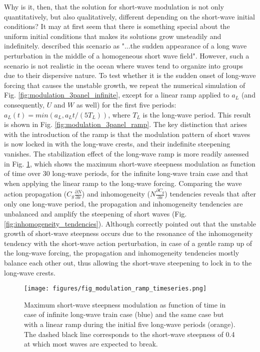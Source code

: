 \documentclass[lineno]{jfm}
\begin{document}
Why is it, then, that the solution for short-wave modulation is not only
quantitatively, but also qualitatively, different depending on the short-wave
initial conditions?
It may at first seem that there is something special about the uniform initial
conditions that makes its solutions grow unsteadily and indefinitely.
\citet{peureux2021unsteady} described this scenario as "...the sudden appearance
of a long wave perturbation in the middle of a homogeneous short wave field".
However, such a scenario is not realistic in the ocean where waves tend to
organize into groups due to their dispersive nature.
To test whether it is the sudden onset of long-wave forcing that causes the
unstable growth, we repeat the numerical simulation of Fig.
\ref{fig:modulation_3panel_infinite}, except for a linear ramp applied to $a_L$
(and consequently, $U$ and $W$ as well) for the first five periods:
$a_L(t) = min(a_L, a_L t / \left(5 T_L\right))$, where $T_L$ is the long-wave period.
This result is shown in Fig. \ref{fig:modulation_3panel_ramp}.
The key distinction that arises with the introduction of the ramp is that the
modulation pattern of short waves is now locked in with the long-wave crests,
and their indefinite steepening vanishes.
The stabilization effect of the long-wave ramp is more readily assessed in
Fig. \ref{fig:unsteady_growth_timeseries}, which shows the maximum short-wave
steepness modulation as function of time over 30 long-wave periods, for the
infinite long-wave train case and that when applying the linear ramp to the
long-wave forcing.
Comparing the wave action propagation ($C_g \frac{\partial N}{\partial x}$) and
inhomogeneity ($N \frac{\partial C_g}{\partial x}$) tendencies reveals that
after only one long-wave period, the propagation and inhomogeneity tendencies
are unbalanced and amplify the steepening of short waves
(Fig. \ref{fig:inhomogeneity_tendencies}).
Although \citet{peureux2021unsteady} correctly pointed out that the unstable
growth of short-wave steepness occurs due to the resonance of the inhomogeneity
tendency with the short-wave action perturbation, in case of a gentle ramp
up of the long-wave forcing, the propagation and inhomogeneity tendencies
mostly balance each other out, thus allowing the short-wave steepening to
lock in to the long-wave crests.

\begin{figure}
  \centering
  \texttt{[image: figures/fig\_modulation\_ramp\_timeseries.png]}
  \caption{
    Maximum short-wave steepness modulation as function of time in case of
    infinite long-wave train case (blue) and the same case but with a linear
    ramp during the initial five long-wave periods (orange). The dashed black
    line corresponds to the short-wave steepness of 0.4 at which most waves are
    expected to break.
  }
  \label{fig:unsteady_growth_timeseries}
\end{figure}
\end{document}
